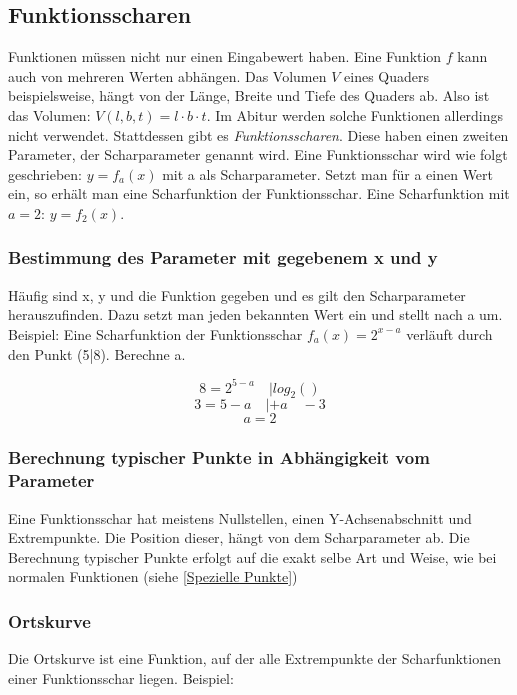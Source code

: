 \documentclass{article}
\begin{document}
	\subsection{Funktionsscharen}

		Funktionen müssen nicht nur einen Eingabewert haben. Eine Funktion $f$ kann auch von mehreren Werten abhängen.
		Das Volumen $V$ eines Quaders beispielsweise, hängt von der Länge, Breite und Tiefe des Quaders ab.
		Also ist das Volumen: $V(l,b,t)=l \cdot b \cdot t$. Im Abitur werden solche Funktionen allerdings nicht verwendet.
		Stattdessen gibt es \emph{Funktionsscharen}. Diese haben einen zweiten Parameter, der Scharparameter genannt wird.
		Eine Funktionsschar wird wie folgt geschrieben: $y=f_a(x)$ mit a als Scharparameter. Setzt man für a einen Wert ein,
		so erhält man eine Scharfunktion der Funktionsschar. Eine Scharfunktion mit $a=2$: $y=f_2(x)$.

		\subsubsection{Bestimmung des Parameter mit gegebenem x und y}
			Häufig sind x, y und die Funktion gegeben und es gilt den Scharparameter herauszufinden. Dazu setzt man jeden bekannten
			Wert ein und stellt nach a um. Beispiel: Eine Scharfunktion der Funktionsschar $f_a(x)=2^{x-a}$
			verläuft durch den Punkt (5|8). Berechne a.
			
			\[ 8=2^{5-a} \quad | log_2() \]
			\[ 3=5-a \quad | +a \quad -3 \]
			\[ a=2 \]

		\subsubsection{Berechnung typischer Punkte in Abhängigkeit vom Parameter}
			Eine Funktionsschar hat meistens Nullstellen, einen Y-Achsenabschnitt und Extrempunkte. Die Position dieser,
			hängt von dem Scharparameter ab. Die Berechnung typischer Punkte erfolgt auf die exakt selbe Art und Weise,
			wie bei normalen Funktionen (siehe \ref{Spezielle Punkte})

		\subsubsection{Ortskurve}

			Die Ortskurve ist eine Funktion, auf der alle Extrempunkte der Scharfunktionen einer Funktionsschar liegen. Beispiel:
\end{document}
